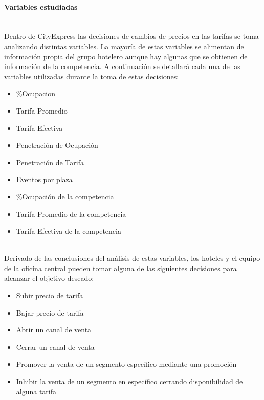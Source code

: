 \documentclass{article}\usepackage[]{graphicx}\usepackage[]{color}
\begin{document}
\paragraph{Variables estudiadas}
~\\
Dentro de CityExpress las decisiones de cambios de precios en las tarifas se toma analizando distintas variables. La mayoría de estas variables se alimentan de información propia del grupo hotelero aunque hay algunas que se obtienen de información de la competencia. A continuación se detallará cada una de las variables utilizadas durante la toma de estas decisiones:
\begin{itemize}[noitemsep]
\item \%Ocupacion
\item Tarifa Promedio
\item Tarifa Efectiva
\item Penetración de Ocupación
\item Penetración de Tarifa
\item Eventos por plaza
\item \%Ocupación de la competencia
\item Tarifa Promedio de la competencia
\item Tarifa Efectiva de la competencia
\end{itemize}
~\\
Derivado de las conclusiones del análisis de estas variables, los hoteles y el equipo de la oficina central pueden tomar alguna de las siguientes decisiones para alcanzar el objetivo deseado:
\begin{itemize}[noitemsep]
\item Subir precio de tarifa
\item Bajar precio de tarifa
\item Abrir un canal de venta
\item Cerrar un canal de venta
\item Promover la venta de un segmento específico mediante una promoción
\item Inhibir la venta de un segmento en específico cerrando disponibilidad de alguna tarifa
\end{itemize}
\end{document}
